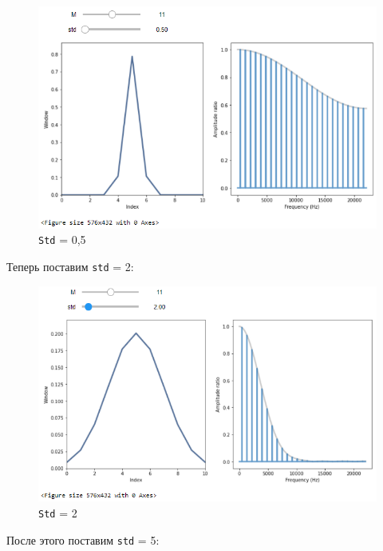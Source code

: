 \documentclass[a4paper]{article}
\begin{document}
            \begin{figure}[H]
                \centering
                \includegraphics[width=\textwidth]{ex_1_std_0_5.png}
                \caption{\texttt{Std} = 0,5}
                \label{fig:ex_1_std_0_5}
            \end{figure}
            
            Теперь поставим \texttt{std} = 2:
            
            \begin{figure}[H]
                \centering
                \includegraphics[width=\textwidth]{ex_1_std_2.png}
                \caption{\texttt{Std} = 2}
                \label{fig:ex_1_std_2}
            \end{figure}
            
            После этого поставим \texttt{std} = 5:
            
\end{document}

